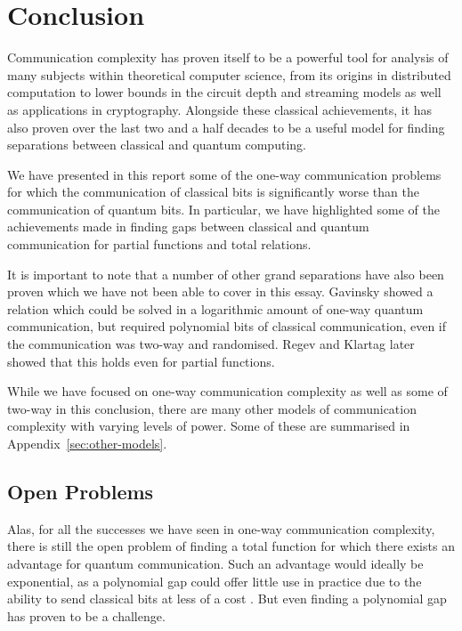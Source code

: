 \documentclass[a4paper]{article}
\begin{document}
    \section{Conclusion}
    \label{sec:conclusion}

        Communication complexity has proven itself to be a powerful tool for analysis of many subjects within theoretical computer science, from its origins in distributed computation to lower bounds in the circuit depth and streaming models as well as applications in cryptography. Alongside these classical achievements, it has also proven over the last two and a half decades to be a useful model for finding separations between classical and quantum computing.

        We have presented in this report some of the one-way communication problems for which the communication of classical bits is significantly worse than the communication of quantum bits. In particular, we have highlighted some of the achievements made in finding gaps between classical and quantum communication for partial functions and total relations.

        It is important to note that a number of other grand separations have also been proven which we have not been able to cover in this essay. Gavinsky \cite{gavinsky2008classical} showed a relation which could be solved in a logarithmic amount of one-way quantum communication, but required polynomial bits of classical communication, even if the communication was two-way and randomised. Regev and Klartag \cite{Regev:2011:QOC:1993636.1993642} later showed that this holds even for partial functions.

        While we have focused on one-way communication complexity as well as some of two-way in this conclusion, there are many other models of communication complexity with varying levels of power. Some of these are summarised in Appendix~\ref{sec:other-models}.

        \subsection{Open Problems}

        Alas, for all the successes we have seen in one-way communication complexity, there is still the open problem of finding a total function for which there exists an advantage for quantum communication. Such an advantage would ideally be exponential, as a polynomial gap could offer little use in practice due to the ability to send classical bits at less of a cost \cite{RevModPhys.82.665}. But even finding a polynomial gap has proven to be a challenge.
\end{document}
